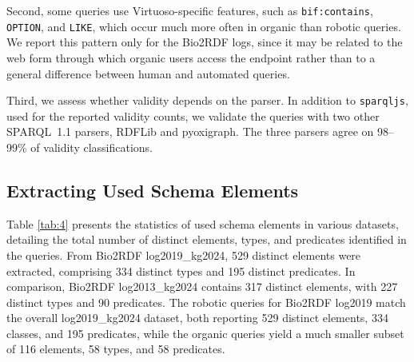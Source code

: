 \documentclass[sw]{iosart2x}
\begin{document}
Second, some queries use Virtuoso-specific features, such as \texttt{bif:contains}, \texttt{OPTION}, and \texttt{LIKE}, which occur much more often in organic than robotic queries. We report this pattern only for the Bio2RDF logs, since it may be related to the web form through which organic users access the endpoint rather than to a general difference between human and automated queries.

Third, we assess whether validity depends on the parser. In addition to \texttt{sparqljs}, used for the reported validity counts, we validate the queries with two other SPARQL~1.1 parsers, RDFLib and pyoxigraph. The three parsers agree on 98--99\% of validity classifications.

\subsection{Extracting Used Schema Elements} 
Table \ref{tab:4} presents the statistics of used schema elements in various datasets, detailing the total number of distinct elements, types, and predicates identified in the queries. From Bio2RDF log2019\_kg2024, 529 distinct elements were extracted, comprising 334 distinct types and 195 distinct predicates. In comparison, Bio2RDF log2013\_kg2024 contains 317 distinct elements, with 227 distinct types and 90 predicates. The robotic queries for Bio2RDF log2019 match the overall log2019\_kg2024 dataset, both reporting 529 distinct elements, 334 classes, and 195 predicates, while the organic queries yield a much smaller subset of 116 elements, 58 types, and 58 predicates.
\end{document}
